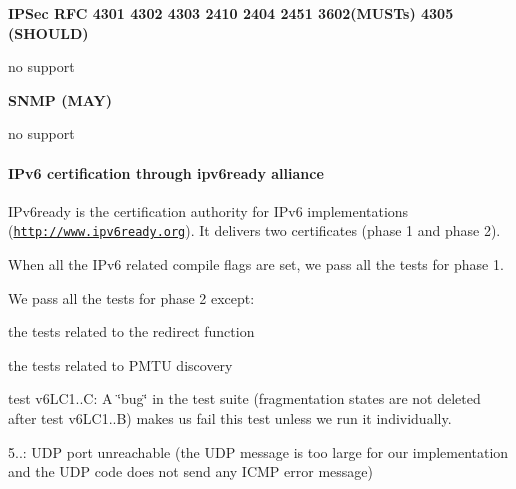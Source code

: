 {\bfseries \-I\-P\-Sec \-R\-F\-C 4301 4302 4303 2410 2404 2451 3602(\-M\-U\-S\-Ts) 4305 (\-S\-H\-O\-U\-L\-D)}\par
 no support

{\bfseries \-S\-N\-M\-P (\-M\-A\-Y)}\par
 no support\hypertarget{a00061_ipv6ready}{}\paragraph{\-I\-Pv6 certification through ipv6ready alliance}\label{a00061_ipv6ready}
\-I\-Pv6ready is the certification authority for \-I\-Pv6 implementations (\href{http://www.ipv6ready.org}{\tt http\-://www.\-ipv6ready.\-org}). \-It delivers two certificates (phase 1 and phase 2).\par
 \-When all the \-I\-Pv6 related compile flags are set, we pass all the tests for phase 1.\par
 \-We pass all the tests for phase 2 except\-: \begin{DoxyItemize}
\item the tests related to the redirect function \item the tests related to \-P\-M\-T\-U discovery \item test v6\-L\-C1..\-C\-: \-A \char`\"{}bug\char`\"{} in the test suite (fragmentation states are not deleted after test v6\-L\-C1..\-B) makes us fail this test unless we run it individually. \item 5..\-: \-U\-D\-P port unreachable (the \-U\-D\-P message is too large for our implementation and the \-U\-D\-P code does not send any \-I\-C\-M\-P error message)\end{DoxyItemize}


 